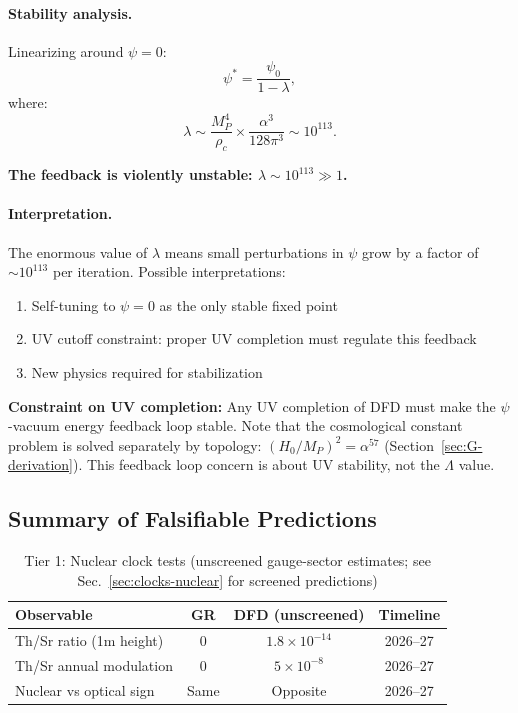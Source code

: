 \paragraph{Stability analysis.}
Linearizing around $\psi = 0$:
\begin{equation}
\psi^* = \frac{\psi_0}{1 - \lambda},
\end{equation}
where:
\begin{equation}
\lambda \sim \frac{M_P^4}{\rho_c} \times \frac{\alpha^3}{128\pi^3} \sim 10^{113}.
\end{equation}

\textbf{The feedback is violently unstable: $\lambda \sim 10^{113} \gg 1$.}

\paragraph{Interpretation.}
The enormous value of $\lambda$ means small perturbations in $\psi$ grow by a factor of $\sim 10^{113}$ per iteration. Possible interpretations:
\begin{enumerate}
\item Self-tuning to $\psi = 0$ as the only stable fixed point
\item UV cutoff constraint: proper UV completion must regulate this feedback
\item New physics required for stabilization
\end{enumerate}

\textbf{Constraint on UV completion:} Any UV completion of DFD must make the $\psi$-vacuum energy feedback loop stable. Note that the cosmological constant problem is solved separately by topology: $(H_0/M_P)^2 = \alpha^{57}$ (Section~\ref{sec:G-derivation}). This feedback loop concern is about UV stability, not the $\Lambda$ value.

\subsection{Summary of Falsifiable Predictions}\label{sec:gauge-predictions}

\begin{table}[h]
\centering
\caption{Tier 1: Nuclear clock tests (unscreened gauge-sector estimates; see Sec.~\ref{sec:clocks-nuclear} for screened predictions)}
\label{tab:tier1-predictions}
\renewcommand{\arraystretch}{1.2}
\begin{tabular}{lccc}
\toprule
Observable & GR & DFD (unscreened) & Timeline \\
\midrule
Th/Sr ratio (1m height) & 0 & $1.8 \times 10^{-14}$ & 2026--27 \\
Th/Sr annual modulation & 0 & $5 \times 10^{-8}$ & 2026--27 \\
Nuclear vs optical sign & Same & Opposite & 2026--27 \\
\bottomrule
\end{tabular}
\end{table}


